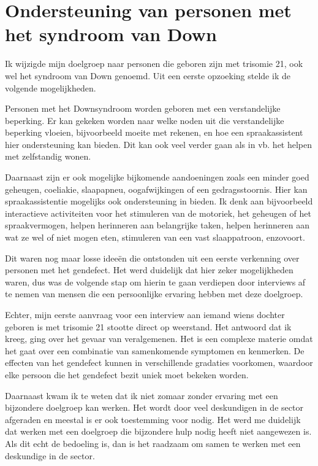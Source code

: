 \section{Ondersteuning van personen met het syndroom van Down}
\label{ondersteuning van personen met het syndroom van Down}
Ik wijzigde mijn doelgroep naar personen die geboren zijn met trisomie 21, ook wel het syndroom van Down genoemd. Uit een eerste opzoeking stelde ik de volgende mogelijkheden.

Personen met het Downsyndroom worden geboren met een verstandelijke beperking. Er kan gekeken worden naar welke noden uit die verstandelijke beperking vloeien, bijvoorbeeld moeite met rekenen, en hoe een spraakassistent hier ondersteuning kan bieden. Dit kan ook veel verder gaan als in vb. het helpen met zelfstandig wonen.

Daarnaast zijn er ook mogelijke bijkomende aandoeningen zoals een minder goed geheugen, coeliakie, slaapapneu, oogafwijkingen of een gedragsstoornis. Hier kan spraakassistentie mogelijks ook ondersteuning in bieden. Ik denk aan bijvoorbeeld interactieve activiteiten voor het stimuleren van de motoriek, het geheugen of het spraakvermogen, helpen herinneren aan belangrijke taken, helpen herinneren aan wat ze wel of niet mogen eten, stimuleren van een vast slaappatroon, enzovoort. \autocite{Volksgezondheidenzorg2019}

Dit waren nog maar losse ideeën die ontstonden uit een eerste verkenning over personen met het gendefect. Het werd duidelijk dat hier zeker mogelijkheden waren, dus was de volgende stap om hierin te gaan verdiepen door interviews af te nemen van mensen die een persoonlijke ervaring hebben met deze doelgroep.

Echter, mijn eerste aanvraag voor een interview aan iemand wiens dochter geboren is met trisomie 21 stootte direct op weerstand. Het antwoord dat ik kreeg, ging over het gevaar van veralgemenen. Het is een complexe materie omdat het gaat over een combinatie van samenkomende symptomen en kenmerken. De effecten van het gendefect kunnen in verschillende gradaties voorkomen, waardoor elke persoon die het gendefect bezit uniek moet bekeken worden.

Daarnaast kwam ik te weten dat ik niet zomaar zonder ervaring met een bijzondere doelgroep kan werken. Het wordt door veel deskundigen in de sector afgeraden en meestal is er ook toestemming voor nodig.
Het werd me duidelijk dat werken met een doelgroep die bijzondere hulp nodig heeft niet aangewezen is. Als dit echt de bedoeling is, dan is het raadzaam om samen te werken met een deskundige in de sector.

